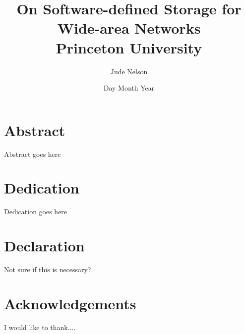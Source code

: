 \documentclass[12pt]{report}
\title{
	{On Software-defined Storage for Wide-area Networks}\\
	{\large Princeton University}\\
}
\author{Jude Nelson}
\date{Day Month Year}
\begin{document}
\maketitle

\chapter*{Abstract}

Abstract goes here

\chapter*{Dedication}

Dedication goes here

\chapter*{Declaration}

Not sure if this is necessary?

\chapter*{Acknowledgements}

I would like to thank....

\tableofcontents









 
\end{document}
